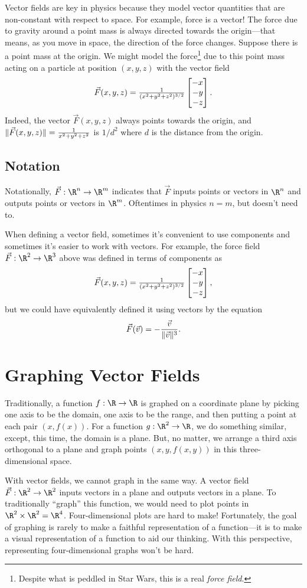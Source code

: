 Vector fields are key in physics because they model
vector quantities that are non-constant with respect to
space.  For example, force is a vector!  The force due to gravity
around a point mass is always directed towards the origin---that
means, as you move in space, the direction of the force 
changes.  Suppose there is a point mass at the origin.
We might model the force\footnote{ Despite what is peddled in
Star Wars, this is a real \emph{force field}.} due to this point mass acting on a particle
at position $(x,y,z)$ with the vector field
\[
	\vec F(x,y,z) = \tfrac{1}{(x^2+y^2+z^2)^{3/2}}\mat{-x\\-y\\-z}.
\]
Indeed, the vector $\vec F(x,y,z)$ always points towards the origin,
and $\lVert\vec F(x,y,z)\rVert=\frac{1}{x^2+y^2+z^2}$ is $1/d^2$ where $d$
is the distance from the origin.


\subsection{Notation}
Notationally, $\vec F:\R^n\to\R^m$ indicates that $\vec F$ inputs points or vectors in $\R^n$
and outputs points or vectors in $\R^m$.  Oftentimes in physics $n=m$, but doesn't need to.

When defining a vector field, sometimes it's convenient to use components
and sometimes it's easier to work with vectors.  For example, the force field
$\vec F:\R^2\to\R^3$ above was defined in terms of components as
\[
	\vec F(x,y,z) = \tfrac{1}{(x^2+y^2+z^2)^{3/2}}\mat{-x\\-y\\-z},
\]
but we could have equivalently defined it using vectors by the equation
\[
	\vec F(\vec v) = -\frac{\vec v}{\lVert\vec v\rVert^3}.
\]


\section{Graphing Vector Fields}

Traditionally, a function $f:\R\to\R$ is graphed on a coordinate
plane by picking one axis to be the domain, one
axis to be the range, and then putting a point at each pair $(x,f(x))$.
For a function $g:\R^2\to\R$, we do something similar, except, this time,
the domain is a plane.  But, no matter, we arrange a third axis orthogonal
to a plane and graph points $(x,y,f(x,y))$ in this three-dimensional space.

With vector fields, we cannot graph in the same way.  A vector field
$\vec F:\R^2\to\R^2$ inputs vectors in a plane and outputs vectors in
a plane. To traditionally ``graph'' this function, we would need to
plot points in $\R^2\times\R^2=\R^4$.  Four-dimensional plots are hard to make!
Fortunately, the goal of graphing is rarely to make a faithful representation
of a function---it is to make a visual representation of a function
to aid our thinking.  With this perspective, representing four-dimensional
graphs won't be hard.

